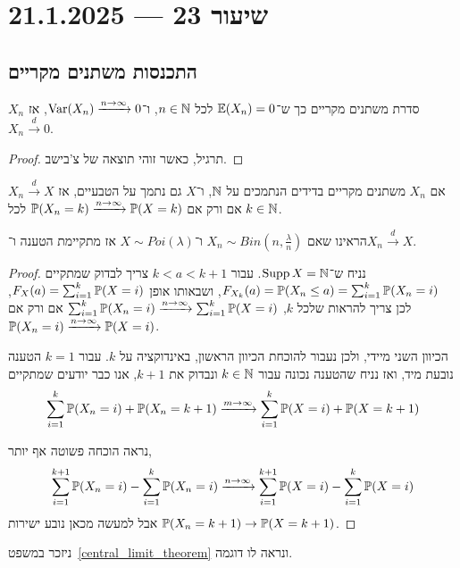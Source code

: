 \section{שיעור 23 --- 21.1.2025}
\subsection{התכנסות משתנים מקריים}
\begin{proposition}
	$X_n$ סדרת משתנים מקריים כך ש־$\mathbb{E}(X_n) = 0$ לכל $n \in \mathbb{N}$, ו־$\operatorname{Var}(X_n) \xrightarrow{n \to \infty} 0$, אז $X_n \xrightarrow{d} 0$.
\end{proposition}
\begin{proof}
	תרגיל, כאשר זוהי תוצאה של צ'בישב.
\end{proof}
\begin{proposition}
	אם $X_n$ משתנים מקריים בדידים הנתמכים על $\mathbb{N}$, ו־$X$ גם נתמך על הטבעיים,
	אז $X_n \xrightarrow{d} X$ אם ורק אם $\mathbb{P}(X_n = k) \xrightarrow{n \to \infty} \mathbb{P}(X = k)$ לכל $k \in \mathbb{N}$.
\end{proposition}
הראינו שאם $X_n \sim Bin(n, \frac{\lambda}{n})$ ו־$X \sim Poi(\lambda)$ אז מתקיימת הטענה ו־$X_n \xrightarrow{d} X$.
\begin{proof}
	נניח ש־$\operatorname{Supp} X = \mathbb{N}$.
	עבור $k < a < k + 1$ צריך לבדוק שמתקיים $F_{X_k}(a) = \mathbb{P}(X_n \le a) = \sum_{i = 1}^{k} \mathbb{P}(X_n = i)$,
	ושבאותו אופן $F_X(a) = \sum_{i = 1}^{k} \mathbb{P}(X = i)$, לכן צריך להראות שלכל $k$,
	$\sum_{i = 1}^{k} \mathbb{P}(X_n = i) \xrightarrow{n \to \infty} \sum_{i = 1}^{k} \mathbb{P}(X = i)$ אם ורק אם $\mathbb{P}(X_n = i) \xrightarrow{n \to \infty} \mathbb{P}(X = i)$.

	הכיוון השני מיידי, ולכן נעבור להוכחת הכיוון הראשון, באינדוקציה על $k$.
	עבור $k = 1$ הטענה נובעת מיד, ואז נניח שהטענה נכונה עבור $k \in \mathbb{N}$ ונבדוק את $k + 1$,
	אנו כבר יודעים שמתקיים
	\[
		\sum_{i = 1}^{k} \mathbb{P}(X_n = i) + \mathbb{P}(X_n = k + 1)
		\xrightarrow{m \to \infty} \sum_{i = 1}^{k} \mathbb{P}(X = i) + \mathbb{P}(X = k + 1)
	\]

	נראה הוכחה פשוטה אף יותר,
	\[
		\sum_{i = 1}^{k + 1} \mathbb{P}(X_n = i) - \sum_{i = 1}^{k} \mathbb{P}(X_n = i)
		\xrightarrow{n \to \infty}
		\sum_{i = 1}^{k + 1} \mathbb{P}(X = i) - \sum_{i = 1}^{k} \mathbb{P}(X = i)
	\]
	אבל למעשה מכאן נובע ישירות $\mathbb{P}(X_n = k + 1) \to \mathbb{P}(X = k + 1)$.
\end{proof}
ניזכר במשפט\ \ref{central_limit_theorem} ונראה לו דוגמה.
